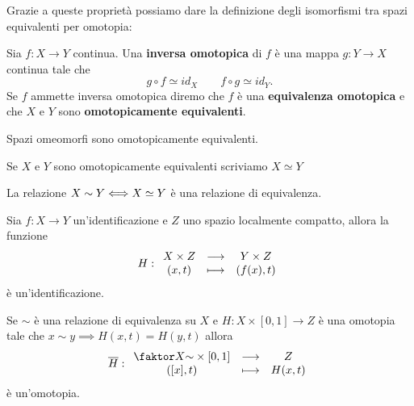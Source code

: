 \begin{multicols*}{2}
\noindent Grazie a queste proprietà possiamo dare la definizione degli isomorfismi tra spazi equivalenti per omotopia:
\begin{definition}
Sia $f:X\to Y$ continua. Una \textbf{inversa omotopica} di $f$ è una mappa $g:Y\to X$ continua tale che
\[g\circ f\simeq id_X\qquad f\circ g\simeq id_Y.\]
Se $f$ ammette inversa omotopica diremo che $f$ è una \textbf{equivalenza omotopica} e che $X$ e $Y$ sono \textbf{omotopicamente equivalenti}.
\end{definition}
\begin{remark}
Spazi omeomorfi sono omotopicamente equivalenti.
\end{remark}
\begin{notation}
Se $X$ e $Y$ sono omotopicamente equivalenti scriviamo $X\simeq Y$
\end{notation}


\begin{proposition}\label{EquivalenzaOmotopicaERelazioneEquivalenza}
La relazione $X\sim Y\Longleftrightarrow X\simeq Y$ è una relazione di equivalenza.
\end{proposition}


\begin{proposition}[]
Sia $f:X\to Y$ un'identificazione e $Z$ uno spazio localmente compatto, allora la funzione
\[H:\begin{array}{ccc} {X\times Z} & \longrightarrow & {Y\times Z}\\ {(x,t)} & \longmapsto & {(f(x),t)} \end{array}\]
\`e un'identificazione.
\end{proposition}
\begin{corollary}\label{OmotopiaPassaAlQuoziente}
Se $\sim$ \`e una relazione di equivalenza su $X$ e $H:X\times[0,1]\to Z$ \`e una omotopia tale che $x\sim y\implies H(x,t)=H(y,t)$ allora
\[\ol H:\funcDef{\quot X\sim\times[0,1]}{Z}{([x],t)}{H(x,t)}\]
\`e un'omotopia.
\end{corollary}


\end{multicols*}
